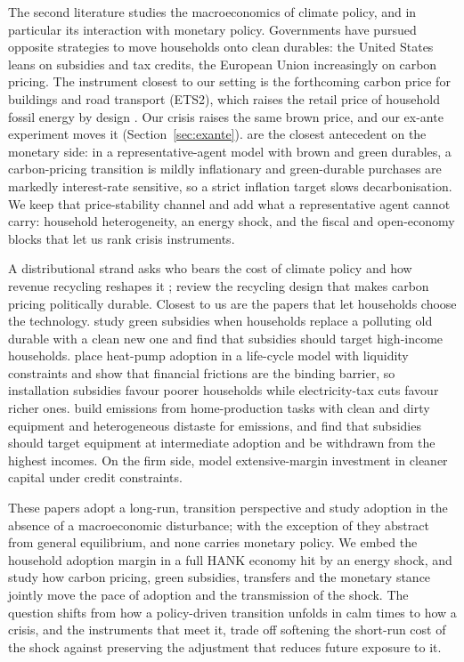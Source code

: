 The second literature studies the macroeconomics of climate policy, and in
particular its interaction with monetary policy. Governments have pursued opposite
strategies to move households onto clean durables: the United States leans on
subsidies and tax credits, the European Union increasingly on carbon pricing. The
instrument closest to our setting is the forthcoming carbon price for buildings and
road transport (ETS2), which raises the retail price of household fossil energy by
design \citep{ECETS2}. Our crisis raises the same brown price, and our ex-ante
experiment moves it (Section~\ref{sec:exante}). \citet{dietrich2025consumer}
are the closest antecedent on the monetary side: in a representative-agent model
with brown and green durables, a carbon-pricing transition is mildly inflationary
and green-durable purchases are markedly interest-rate sensitive, so a strict
inflation target slows decarbonisation. We keep that price-stability channel and add
what a representative agent cannot carry: household heterogeneity, an energy shock,
and the fiscal and open-economy blocks that let us rank crisis instruments.

A distributional strand asks who bears the cost of climate policy and how revenue
recycling reshapes it \citep{fried2018distributional,fried2024understanding,ascari2025inequality}; \citet{klenert2018making}
review the recycling design that makes carbon pricing politically durable. Closest to
us are the papers that let households choose the technology. \citet{kuhn2024distributional} study
green subsidies when households replace a polluting old durable with a clean new one
and find that subsidies should target high-income households. \citet{crucitti2024green}
place heat-pump adoption in a life-cycle model with liquidity constraints and show
that financial frictions are the binding barrier, so installation subsidies favour
poorer households while electricity-tax cuts favour richer ones. \citet{fried2025}
build emissions from home-production tasks with clean and dirty equipment and
heterogeneous distaste for emissions, and find that subsidies should target
equipment at intermediate adoption and be withdrawn from the highest incomes. On the
firm side, \citet{lanteri2025financing} model extensive-margin investment in cleaner capital
under credit constraints.

These papers adopt a long-run, transition perspective and study adoption in the
absence of a macroeconomic disturbance; with the exception of \citet{fried2025} they
abstract from general equilibrium, and none carries monetary policy. We embed the
household adoption margin in a full HANK economy hit by an energy shock, and study
how carbon pricing, green subsidies, transfers and the monetary stance jointly move
the pace of adoption and the transmission of the shock. The question shifts from how
a policy-driven transition unfolds in calm times to how a crisis, and the
instruments that meet it, trade off softening the short-run cost of the shock
against preserving the adjustment that reduces future exposure to it.

